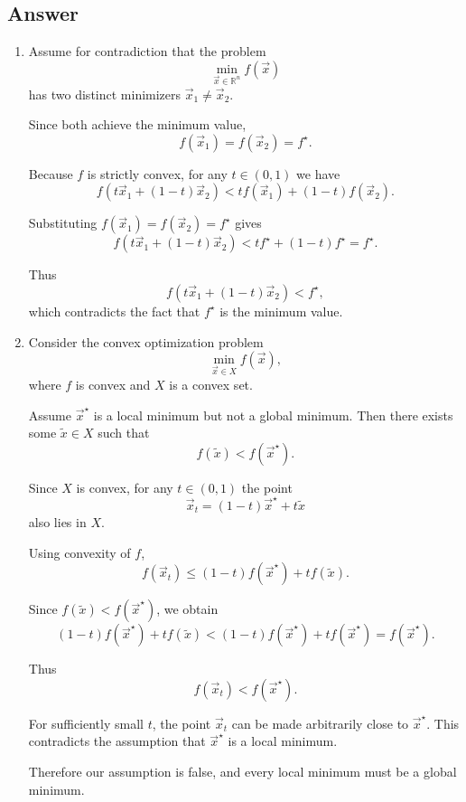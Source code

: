 \documentclass[
  12pt,
]{fphw}
\begin{document}
\subsection*{Answer}
\begin{enumerate}

\item[(a)]

Assume for contradiction that the problem
\[
\min_{\vec{x} \in \mathbb{R}^n} f(\vec{x})
\]
has two distinct minimizers $\vec{x}_1 \neq \vec{x}_2$.

Since both achieve the minimum value,
\[
f(\vec{x}_1) = f(\vec{x}_2) = f^\star.
\]

Because $f$ is strictly convex, for any $t \in (0,1)$ we have
\[
f(t\vec{x}_1 + (1-t)\vec{x}_2)
<
t f(\vec{x}_1) + (1-t) f(\vec{x}_2).
\]

Substituting $f(\vec{x}_1) = f(\vec{x}_2) = f^\star$ gives
\[
f(t\vec{x}_1 + (1-t)\vec{x}_2)
<
t f^\star + (1-t) f^\star
=
f^\star.
\]

Thus
\[
f(t\vec{x}_1 + (1-t)\vec{x}_2) < f^\star,
\]
which contradicts the fact that $f^\star$ is the minimum value.


\item[(b)]

Consider the convex optimization problem
\[
\min_{\vec{x} \in X} f(\vec{x}),
\]
where $f$ is convex and $X$ is a convex set.

Assume $\vec{x}^\star$ is a local minimum but not a global minimum. Then there exists some $\tilde{x} \in X$ such that
\[
f(\tilde{x}) < f(\vec{x}^\star).
\]

Since $X$ is convex, for any $t \in (0,1)$ the point
\[
\vec{x}_t = (1-t)\vec{x}^\star + t\tilde{x}
\]
also lies in $X$.

Using convexity of $f$,
\[
f(\vec{x}_t)
\le
(1-t)f(\vec{x}^\star) + t f(\tilde{x}).
\]

Since $f(\tilde{x}) < f(\vec{x}^\star)$, we obtain
\[
(1-t)f(\vec{x}^\star) + t f(\tilde{x})
<
(1-t)f(\vec{x}^\star) + t f(\vec{x}^\star)
=
f(\vec{x}^\star).
\]

Thus
\[
f(\vec{x}_t) < f(\vec{x}^\star).
\]

For sufficiently small $t$, the point $\vec{x}_t$ can be made arbitrarily close to $\vec{x}^\star$. This contradicts the assumption that $\vec{x}^\star$ is a local minimum.

Therefore our assumption is false, and every local minimum must be a global minimum.

\end{enumerate}
\end{document}
